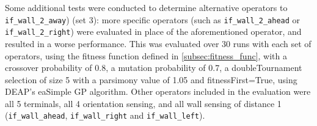 \documentclass[british,10pt,a4paper]{article}
\begin{document}
Some additional tests were conducted to determine alternative operators to \texttt{if\_wall\_2\_away}) (set 3): more specific operators (such as \texttt{if\_wall\_2\_ahead} or \texttt{if\_wall\_2\_right}) were evaluated in place of the aforementioned operator, and resulted in a worse performance. This was evaluated over 30 runs with each set of operators, using the fitness function defined in \autoref{subsec:fitness_func}, with a crossover probability of 0.8, a mutation probability of 0.7, a doubleTournament selection of size 5 with a parsimony value of 1.05 and fitnessFirst=True, using DEAP's eaSimple GP algorithm. Other operators included in the evaluation were all 5 terminals, all 4 orientation sensing, and all wall sensing of distance 1 (\texttt{if\_wall\_ahead}, \texttt{if\_wall\_right} and \texttt{if\_wall\_left}). \newline
\end{document}
